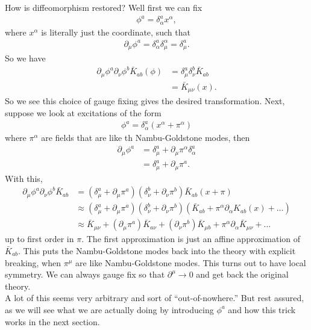\documentclass{book}
\theoremstyle{definition}
\newcommand{\p}{\partial}
\newcommand{\nn}{\nonumber}
\begin{document}
How is diffeomorphism restored? Well first we can fix
\begin{align}
\phi^a = \delta^a_\alpha x^\alpha,
\end{align} 
where $x^\alpha$ is literally just the coordinate, such that
\begin{align}
\p_\mu \phi^a = \delta^a_\alpha \delta^\alpha_\mu = \delta^a_\mu.
\end{align}
So we have
\begin{align}
\p_\mu \phi^a\p_\nu \phi^b \bar{K}_{ab}(\phi) &= \delta^a_\mu \delta^b_\nu \bar{K}_{ab} \nn\\
&= \bar{K}_{\mu\nu}(x).
\end{align}
So we see this choice of gauge fixing gives the desired transformation. Next, suppose we look at excitations of the form
\begin{align}
\phi^a = \delta^a_\alpha(x^\alpha +\pi^\alpha)
\end{align}
where $\pi^\alpha$ are fields that are like th Nambu-Goldstone modes, then
\begin{align}
\p_\mu \phi^a &= \delta^a_\mu + \p_\mu \pi^\alpha \delta^a_\alpha\nn\\
&= \delta^a_\mu + \p_\mu \pi^a.
\end{align}
With this,
\begin{align}
\p_\mu \phi^a \p_\nu \phi^b \bar{K}_{ab} &= (\delta^a_\mu + \p_\mu \pi^a)(\delta^b_\nu + \p_\nu \pi^b)\bar{K}_{ab}(x+\pi)\nn\\
&\approx  (\delta^a_\mu + \p_\mu \pi^a)(\delta^b_\nu + \p_\nu \pi^b)(\bar{K}_{ab} + \pi^\alpha \p_\alpha K_{ab}(x) + \dots)\nn\\
&\approx \bar{K}_{\mu\nu} + (\p_\mu \pi^a)\bar{K}_{a\nu} + (\p_\nu \pi^b)\bar{K}_{\mu b} + \pi^\alpha \p_\alpha \bar{K}_{\mu\nu} + \dots
\end{align}
up to first order in $\pi$. The first approximation is just an affine approximation of $\bar{K}_{ab}$. This puts the Nambu-Goldstone modes back into the theory with explicit breaking, when $\pi^\mu$ are like Nambu-Goldstone modes. This turns out to have local symmetry. We can always gauge fix so that $\p^\mu \to 0$ and get back the original theory. \\

A lot of this seems very arbitrary and sort of ``out-of-nowhere.'' But rest assured, as we will see what we are actually doing by introducing $\phi^a$ and how this trick works in the next section.
\end{document}
